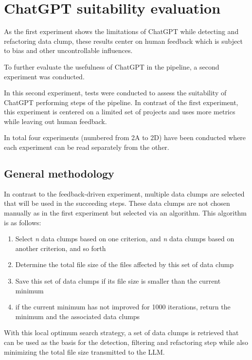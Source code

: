 
\section{ChatGPT suitability evaluation}\label{sec:metric_based_eval}

As the first experiment shows the limitations of ChatGPT while detecting and refactoring data clump, these results center on human feedback which is subject to bias and other uncontrollable influences. 

To further evaluate the usefulness of ChatGPT in the pipeline, a second experiment was conducted.

In this second experiment, tests were conducted to assess the suitability of ChatGPT performing steps of the pipeline. In contrast of the first experiment, this experiment is centered on a limited set of projects and uses more metrics while leaving out human feedback. 

In total four experiments (numbered from 2A to 2D) have been conducted where each experiment can be read separately from the other.

\subsection{General methodology}

In contrast to the feedback-driven experiment, multiple data clumps are selected that will be used in the succeeding steps. These data clumps are not chosen manually as in the first experiment but selected via an algorithm. This algorithm is as follows:
\begin{enumerate}
    \item Select 
\textit{n}
 data clumps based on one criterion, and 
\textit{n}
 data clumps based on another criterion, and so forth
    \item Determine the total file size of the files affected by this set of data clump
    \item Save this set of data clumps if its file size is smaller than the current minimum
    \item if the current minimum has not improved for 1000 iterations, return the minimum and the associated data clumps
\end{enumerate}

With this local optimum search strategy, a set of data clumps is retrieved that can be used as the basis for the detection, filtering and refactoring step while also minimizing the total file size transmitted to the \ac{LLM}. 

